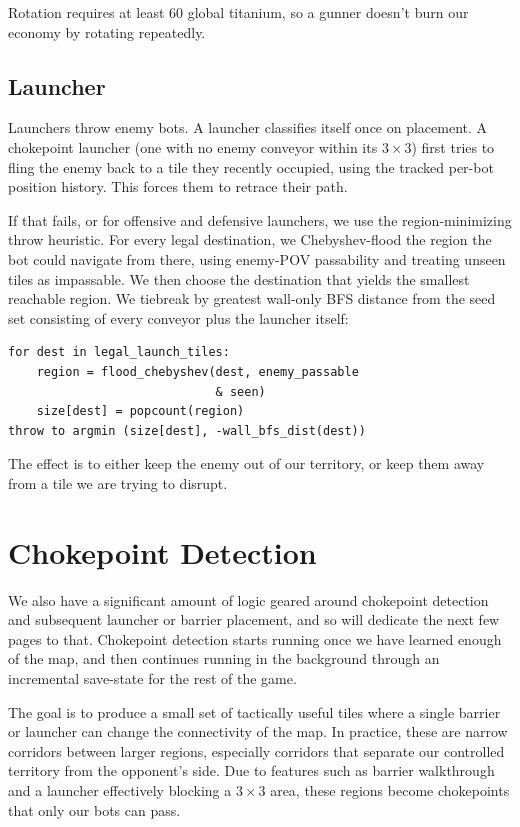 \documentclass[10pt,sigconf,nonacm]{acmart}
\begin{document}
Rotation requires at least 60 global titanium, so a gunner doesn't burn our economy by rotating repeatedly.

\subsection{Launcher}

Launchers throw enemy bots. A launcher classifies itself once on placement. A chokepoint launcher (one with no enemy conveyor within its $3\times3$) first tries to fling the enemy back to a tile they recently occupied, using the tracked per-bot position history. This forces them to retrace their path.

If that fails, or for offensive and defensive launchers, we use the region-minimizing throw heuristic. For every legal destination, we Chebyshev-flood the region the bot could navigate from there, using enemy-POV passability and treating unseen tiles as impassable. We then choose the destination that yields the smallest reachable region. We tiebreak by greatest wall-only BFS distance from the seed set consisting of every conveyor plus the launcher itself:

\begin{lstlisting}
for dest in legal_launch_tiles:
    region = flood_chebyshev(dest, enemy_passable
                             & seen)
    size[dest] = popcount(region)
throw to argmin (size[dest], -wall_bfs_dist(dest))
\end{lstlisting}

The effect is to either keep the enemy out of our territory, or keep them away from a tile we are trying to disrupt.

\section{Chokepoint Detection}

We also have a significant amount of logic geared around chokepoint
detection and subsequent launcher or barrier placement, and so will dedicate the next few pages to that. Chokepoint
detection starts running once we have learned enough of the map, and then
continues running in the background through an incremental save-state for
the rest of the game.

The goal is to produce a small set of tactically useful tiles where a single
barrier or launcher can change the connectivity of the map. In practice,
these are narrow corridors between larger regions, especially corridors
that separate our controlled territory from the opponent's side. Due to
features such as barrier walkthrough and a launcher effectively blocking a
$3\times3$ area, these regions become chokepoints that only our bots can pass.
\end{document}
